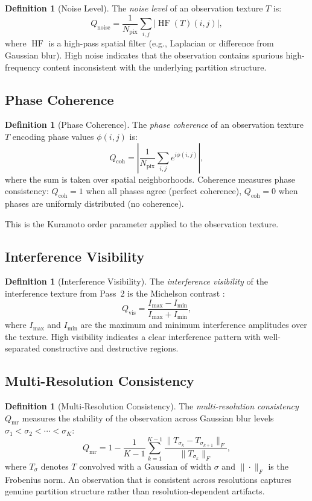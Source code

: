 \documentclass[11pt,twocolumn,a4paper]{article}
\theoremstyle{definition}
\newtheorem{definition}[theorem]{Definition}
\theoremstyle{remark}
\DeclareMathOperator{\HF}{HF}
\newcommand{\Qnoise}{Q_{\mathrm{noise}}}
\newcommand{\Qcoh}{Q_{\mathrm{coh}}}
\newcommand{\Qvis}{Q_{\mathrm{vis}}}
\newcommand{\Qmr}{Q_{\mathrm{mr}}}
\newcommand{\Npix}{N_{\mathrm{pix}}}
\begin{document}
\begin{definition}[Noise Level]
\label{def:noise}
The \emph{noise level} of an observation texture $T$ is:
\[
\Qnoise = \frac{1}{\Npix} \sum_{i,j} |\HF(T)(i,j)|,
\]
where $\HF$ is a high-pass spatial filter (e.g., Laplacian or difference from Gaussian blur). High noise indicates that the observation contains spurious high-frequency content inconsistent with the underlying partition structure.
\end{definition}

\subsection{Phase Coherence}

\begin{definition}[Phase Coherence]
\label{def:coherence}
The \emph{phase coherence} of an observation texture $T$ encoding phase values $\phi(i,j)$ is:
\[
\Qcoh = \left| \frac{1}{\Npix} \sum_{i,j} e^{i\phi(i,j)} \right|,
\]
where the sum is taken over spatial neighborhoods. Coherence measures phase consistency: $\Qcoh = 1$ when all phases agree (perfect coherence), $\Qcoh = 0$ when phases are uniformly distributed (no coherence).
\end{definition}

This is the Kuramoto order parameter \citep{kuramoto1975, kuramoto1984} applied to the observation texture.

\subsection{Interference Visibility}

\begin{definition}[Interference Visibility]
\label{def:visibility}
The \emph{interference visibility} of the interference texture from Pass~2 is the Michelson contrast \citep{michelson1927}:
\[
\Qvis = \frac{I_{\max} - I_{\min}}{I_{\max} + I_{\min}},
\]
where $I_{\max}$ and $I_{\min}$ are the maximum and minimum interference amplitudes over the texture. High visibility indicates a clear interference pattern with well-separated constructive and destructive regions.
\end{definition}

\subsection{Multi-Resolution Consistency}

\begin{definition}[Multi-Resolution Consistency]
\label{def:multiresolution}
The \emph{multi-resolution consistency} $\Qmr$ measures the stability of the observation across Gaussian blur levels $\sigma_1 < \sigma_2 < \cdots < \sigma_K$:
\[
\Qmr = 1 - \frac{1}{K-1} \sum_{k=1}^{K-1} \frac{\|T_{\sigma_k} - T_{\sigma_{k+1}}\|_F}{\|T_{\sigma_k}\|_F},
\]
where $T_{\sigma}$ denotes $T$ convolved with a Gaussian of width $\sigma$ and $\|\cdot\|_F$ is the Frobenius norm. An observation that is consistent across resolutions captures genuine partition structure rather than resolution-dependent artifacts.
\end{definition}
\end{document}
